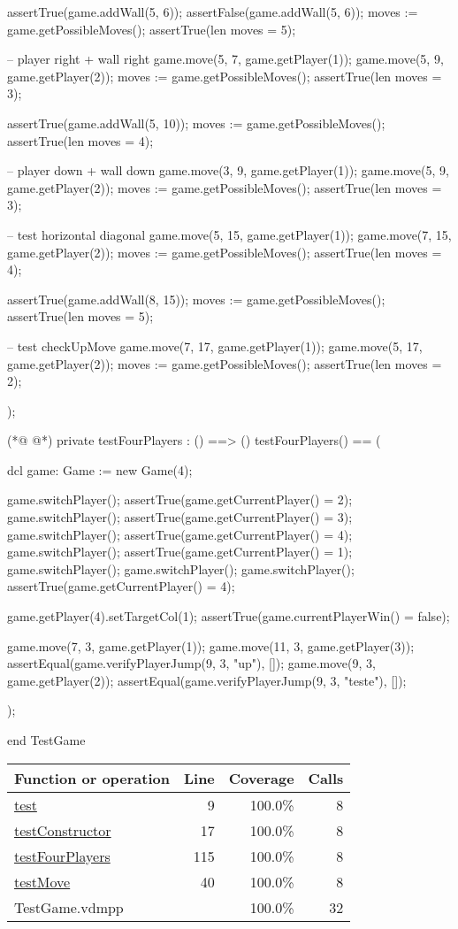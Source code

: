 \begin{vdmpp}[breaklines=true]
  assertTrue(game.addWall(5, 6));
  assertFalse(game.addWall(5, 6));
  moves := game.getPossibleMoves();
  assertTrue(len moves = 5);
  
  -- player right + wall right
  game.move(5, 7, game.getPlayer(1));
  game.move(5, 9, game.getPlayer(2));
  moves := game.getPossibleMoves();
  assertTrue(len moves = 3);
  
  assertTrue(game.addWall(5, 10));
  moves := game.getPossibleMoves();
  assertTrue(len moves = 4);
  
  -- player down + wall down
  game.move(3, 9, game.getPlayer(1));
  game.move(5, 9, game.getPlayer(2));
  moves := game.getPossibleMoves();
  assertTrue(len moves = 3);
  
  -- test horizontal diagonal
  game.move(5, 15, game.getPlayer(1));
  game.move(7, 15, game.getPlayer(2));
  moves := game.getPossibleMoves();
  assertTrue(len moves = 4);
  
  assertTrue(game.addWall(8, 15));
  moves := game.getPossibleMoves();
  assertTrue(len moves = 5);
  
  -- test checkUpMove
  game.move(7, 17, game.getPlayer(1));
  game.move(5, 17, game.getPlayer(2));
  moves := game.getPossibleMoves();
  assertTrue(len moves = 2);
  
 );
 
(*@
\label{testFourPlayers:115}
@*)
 private testFourPlayers : () ==> ()
 testFourPlayers() ==
 (
 
  dcl
  game: Game := new Game(4);
  
  game.switchPlayer();
  assertTrue(game.getCurrentPlayer() = 2);
  game.switchPlayer();
  assertTrue(game.getCurrentPlayer() = 3);
  game.switchPlayer();
  assertTrue(game.getCurrentPlayer() = 4);
  game.switchPlayer();
  assertTrue(game.getCurrentPlayer() = 1);
  game.switchPlayer();
  game.switchPlayer();
  game.switchPlayer();
  assertTrue(game.getCurrentPlayer() = 4);
  
  game.getPlayer(4).setTargetCol(1);
  assertTrue(game.currentPlayerWin() = false);
  
  game.move(7, 3, game.getPlayer(1));
  game.move(11, 3, game.getPlayer(3));
  assertEqual(game.verifyPlayerJump(9, 3, "up"), []);
  game.move(9, 3, game.getPlayer(2));
  assertEqual(game.verifyPlayerJump(9, 3, "teste"), []);
 
 );
 
end TestGame
\end{vdmpp}
\bigskip
\begin{longtable}{|l|r|r|r|}
\hline
Function or operation & Line & Coverage & Calls \\
\hline
\hline
\hyperref[test:9]{test} & 9&100.0\% & 8 \\
\hline
\hyperref[testConstructor:17]{testConstructor} & 17&100.0\% & 8 \\
\hline
\hyperref[testFourPlayers:115]{testFourPlayers} & 115&100.0\% & 8 \\
\hline
\hyperref[testMove:40]{testMove} & 40&100.0\% & 8 \\
\hline
\hline
TestGame.vdmpp & & 100.0\% & 32 \\
\hline
\end{longtable}

